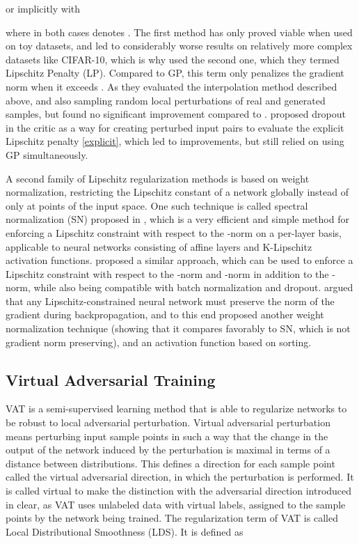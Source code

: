 \documentclass{article}
\begin{document}
or implicitly with

where in both cases  denotes . The first method has only proved viable when used on toy datasets, and led to considerably worse results on relatively more complex datasets like CIFAR-10, which is why \citet{Petzkaetal2018} used the second one, which they termed Lipschitz Penalty (LP). Compared to GP, this term only penalizes the gradient norm when it exceeds . As  they evaluated the interpolation method described above, and also sampling random local perturbations of real and generated samples, but found no significant improvement compared to . \citet{Weietal2018} proposed dropout in the critic as a way for creating perturbed input pairs to evaluate the explicit Lipschitz penalty \eqref{explicit}, which led to improvements, but still relied on using GP simultaneously.

A second family of Lipschitz regularization methods is based on weight normalization, restricting the Lipschitz constant of a network globally instead of only at points of the input space. One such technique is called spectral normalization (SN) proposed in \citet{Miyatoetal2018}, which is a very efficient and simple method for enforcing a Lipschitz constraint with respect to the -norm on a per-layer basis, applicable to neural networks consisting of affine layers and K-Lipschitz activation functions. \citet{Gouketal2018} proposed a similar approach, which can be used to enforce a Lipschitz constraint with respect to the -norm and -norm in addition to the -norm, while also being compatible with batch normalization and dropout. \citet{Aniletal2018} argued that any Lipschitz-constrained neural network must preserve the norm of the gradient during backpropagation, and to this end proposed another weight normalization technique (showing that it compares favorably to SN, which is not gradient norm preserving), and an activation function based on sorting.

\subsection{Virtual Adversarial Training}
VAT \citep{Miyatoetal2017} is a semi-supervised learning method that is able to regularize networks to be robust to local adversarial perturbation. Virtual adversarial perturbation means perturbing input sample points in such a way that the change in the output of the network induced by the perturbation is maximal in terms of a distance between distributions. This defines a direction for each sample point called the virtual adversarial direction, in which the perturbation is performed. It is called virtual to make the distinction with the adversarial direction introduced in \citet{Goodfellowetal2014b} clear, as VAT uses unlabeled data with virtual labels, assigned to the sample points by the network being trained. The regularization term of VAT is called Local Distributional Smoothness (LDS). It is defined as
\end{document}
